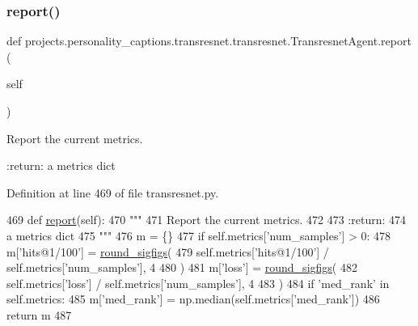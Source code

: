 \subsubsection{\texorpdfstring{report()}{report()}}
{\footnotesize\ttfamily def projects.\+personality\+\_\+captions.\+transresnet.\+transresnet.\+Transresnet\+Agent.\+report (\begin{DoxyParamCaption}\item[{}]{self }\end{DoxyParamCaption})}

\begin{DoxyVerb}Report the current metrics.

:return:
    a metrics dict
\end{DoxyVerb}
 

Definition at line 469 of file transresnet.\+py.


\begin{DoxyCode}
469     \textcolor{keyword}{def }\hyperlink{namespaceprojects_1_1convai2_1_1eval__f1_a01a47b9c08dad189837a51f085defc45}{report}(self):
470         \textcolor{stringliteral}{"""}
471 \textcolor{stringliteral}{        Report the current metrics.}
472 \textcolor{stringliteral}{}
473 \textcolor{stringliteral}{        :return:}
474 \textcolor{stringliteral}{            a metrics dict}
475 \textcolor{stringliteral}{        """}
476         m = \{\}
477         \textcolor{keywordflow}{if} self.metrics[\textcolor{stringliteral}{'num\_samples'}] > 0:
478             m[\textcolor{stringliteral}{'hits@1/100'}] = \hyperlink{namespaceparlai_1_1agents_1_1legacy__agents_1_1seq2seq_1_1utils__v0_af377ec61bfc0423461e7b409ffc883b9}{round\_sigfigs}(
479                 self.metrics[\textcolor{stringliteral}{'hits@1/100'}] / self.metrics[\textcolor{stringliteral}{'num\_samples'}], 4
480             )
481             m[\textcolor{stringliteral}{'loss'}] = \hyperlink{namespaceparlai_1_1agents_1_1legacy__agents_1_1seq2seq_1_1utils__v0_af377ec61bfc0423461e7b409ffc883b9}{round\_sigfigs}(
482                 self.metrics[\textcolor{stringliteral}{'loss'}] / self.metrics[\textcolor{stringliteral}{'num\_samples'}], 4
483             )
484             \textcolor{keywordflow}{if} \textcolor{stringliteral}{'med\_rank'} \textcolor{keywordflow}{in} self.metrics:
485                 m[\textcolor{stringliteral}{'med\_rank'}] = np.median(self.metrics[\textcolor{stringliteral}{'med\_rank'}])
486         \textcolor{keywordflow}{return} m
487 
\end{DoxyCode}
\mbox{\label{classprojects_1_1personality__captions_1_1transresnet_1_1transresnet_1_1TransresnetAgent_a8d88f87cd908c48580910e8458c873b3}} 
